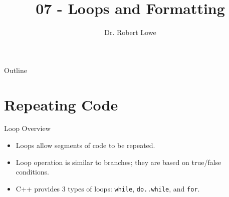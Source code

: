 \documentclass[xcolor=table]{beamer}
\title{07 - Loops and Formatting}
\author{Dr. Robert Lowe\\}
\institute[Maryville College] %
{
  Division of Mathematics and Computer Science\\
  Maryville College
}
\date[]{}
\begin{document}
\begin{frame}
  \titlepage
\end{frame}

\begin{frame}{Outline}
  \tableofcontents
\end{frame}





\section{Repeating Code}

\begin{frame}{Loop Overview}
  \begin{itemize}[<+->]
    \item Loops allow segments of code to be repeated.
    \item Loop operation is similar to branches; they are based on true/false conditions.
    \item C++ provides 3 types of loops: \texttt{while}, \texttt{do..while}, and \texttt{for}.
  \end{itemize}
\end{frame}
\end{document}
